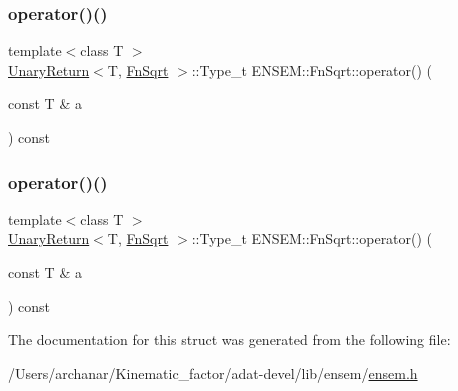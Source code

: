 \mbox{\label{structENSEM_1_1FnSqrt_acec9d842c8abf3aff70bc3c16a5473ce}} 
\subsubsection{\texorpdfstring{operator()()}{operator()()}\hspace{0.1cm}{\footnotesize\ttfamily [2/3]}}
{\footnotesize\ttfamily template$<$class T $>$ \\
\mbox{\hyperlink{structENSEM_1_1UnaryReturn}{Unary\+Return}}$<$T, \mbox{\hyperlink{structENSEM_1_1FnSqrt}{Fn\+Sqrt}} $>$\+::Type\+\_\+t E\+N\+S\+E\+M\+::\+Fn\+Sqrt\+::operator() (\begin{DoxyParamCaption}\item[{const T \&}]{a }\end{DoxyParamCaption}) const\hspace{0.3cm}{\ttfamily [inline]}}

\mbox{\label{structENSEM_1_1FnSqrt_acec9d842c8abf3aff70bc3c16a5473ce}} 
\subsubsection{\texorpdfstring{operator()()}{operator()()}\hspace{0.1cm}{\footnotesize\ttfamily [3/3]}}
{\footnotesize\ttfamily template$<$class T $>$ \\
\mbox{\hyperlink{structENSEM_1_1UnaryReturn}{Unary\+Return}}$<$T, \mbox{\hyperlink{structENSEM_1_1FnSqrt}{Fn\+Sqrt}} $>$\+::Type\+\_\+t E\+N\+S\+E\+M\+::\+Fn\+Sqrt\+::operator() (\begin{DoxyParamCaption}\item[{const T \&}]{a }\end{DoxyParamCaption}) const\hspace{0.3cm}{\ttfamily [inline]}}



The documentation for this struct was generated from the following file\+:\begin{DoxyCompactItemize}
\item 
/\+Users/archanar/\+Kinematic\+\_\+factor/adat-\/devel/lib/ensem/\mbox{\hyperlink{adat-devel_2lib_2ensem_2ensem_8h}{ensem.\+h}}\end{DoxyCompactItemize}
